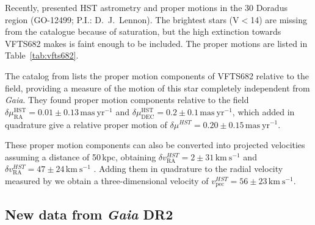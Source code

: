 \documentclass[apjl,twocolumn]{emulateapj}
\newcommand{\kms}{{\,\mathrm{km\ s^{-1}}}}
\DeclareRobustCommand{\Tabref}[1]{Table~\ref{#1}}
\begin{document}
Recently, \citet{platais:18} presented HST astrometry and proper
motions in the 30 Doradus region (GO-12499; P.I.: D.~J.~Lennon). The
brightest stars (V$<$14) are missing from the catalogue because of
saturation, but the high extinction towards VFTS682 makes is faint
enough to be included. %
The  proper motions are
listed in \Tabref{tab:vfts682}. 


The catalog from \citet{platais:18} lists the proper motion
components of VFTS682 relative to the field, providing a
measure of the motion of this star completely independent from
\emph{Gaia}. They found proper
motion components relative to the field
$\delta\mu_\mathrm{RA}^\mathrm{HST} = 0.01\pm0.13\,\mathrm{mas\
  yr^{-1}}$ and
$\delta\mu_\mathrm{DEC}^\mathrm{HST}=0.2\pm0.1\,\mathrm{mas\
  yr^{-1}}$, which added in quadrature give a relative proper motion of
$\delta \mu^{HST} =0.20 \pm 0.15\,\mathrm{mas\ yr^{-1}}$.

These proper motion components can also be converted into projected
velocities assuming a distance of 50\,kpc, obtaining $\delta
v_\mathrm{RA}^{HST}=2\pm31\kms$ and $\delta
v_\mathrm{RA}^{HST}=47\pm24\kms$%
.
Adding them in quadrature to the radial velocity
measured by \citet{bestenlehner:11} we obtain a three-dimensional velocity of
$v_\mathrm{pec}^{HST}=56 \pm 23  \kms$.


\subsection{New data from \emph{Gaia} DR2  \label{data:gaia}}
\end{document}
